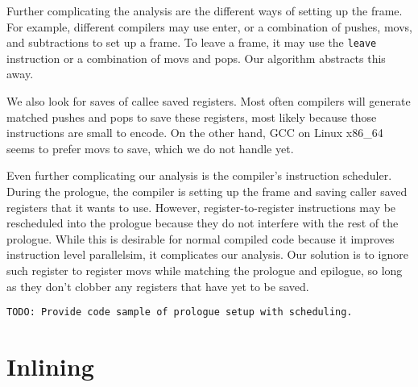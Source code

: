 Further complicating the analysis are the different ways of setting up the
frame.  For example, different compilers may use enter, or a combination of
pushes, movs, and subtractions to set up a frame.  To leave a frame, it may use
the {\tt leave} instruction or a combination of movs and pops.  Our algorithm
abstracts this away.

We also look for saves of callee saved registers.  Most often compilers will
generate matched pushes and pops to save these registers, most likely because
those instructions are small to encode.  On the other hand, GCC on Linux x86\_64
seems to prefer movs to save, which we do not handle yet.

Even further complicating our analysis is the compiler's instruction scheduler.
During the prologue, the compiler is setting up the frame and saving
caller saved registers that it wants to use.  However, register-to-register
instructions may be rescheduled into the prologue because they do not interfere
with the rest of the prologue.  While this is desirable for normal compiled
code because it improves instruction level parallelsim, it complicates our
analysis.  Our solution is to ignore such register to register movs while
matching the prologue and epilogue, so long as they don't clobber any registers
that have yet to be saved.


\begin{verbatim}
TODO: Provide code sample of prologue setup with scheduling.
\end{verbatim}

\section{Inlining}



